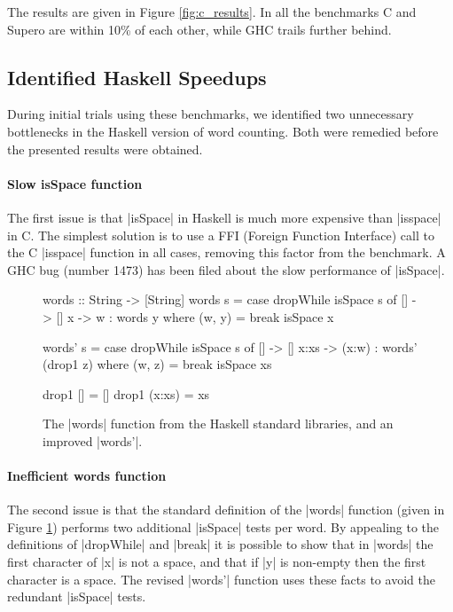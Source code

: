 The results are given in Figure \ref{fig:c_results}. In all the benchmarks C and Supero are within 10\% of each other, while GHC trails further behind.

\subsection{Identified Haskell Speedups}

During initial trials using these benchmarks, we identified two unnecessary bottlenecks in the Haskell version of word counting. Both were remedied before the presented results were obtained.

\paragraph{Slow \textsf{isSpace} function}

The first issue is that |isSpace| in Haskell is much more expensive than |isspace| in C. The simplest solution is to use a FFI (Foreign Function Interface) \cite{spj:awkward_squad} call to the C |isspace| function in all cases, removing this factor from the benchmark. A GHC bug (number 1473) has been filed about the slow performance of |isSpace|.

\begin{figure}
\begin{code}
words :: String -> [String]
words s = case  dropWhile isSpace s of
                []  ->  []
                x   ->  w : words y
                        where (w, y) = break isSpace x

words' s = case  dropWhile isSpace s of
                 []    ->  []
                 x:xs  ->  (x:w) : words' (drop1 z)
                           where (w, z) = break isSpace xs

drop1 []      = []
drop1 (x:xs)  = xs
\end{code}
\caption{The |words| function from the Haskell standard libraries, and an improved |words'|.}
\label{fig:words}
\end{figure}

\paragraph{Inefficient \textsf{words} function}

The second issue is that the standard definition of the |words| function (given in Figure \ref{fig:words}) performs two additional |isSpace| tests per word. By appealing to the definitions of |dropWhile| and |break| it is possible to show that in |words| the first character of |x| is not a space, and that if |y| is non-empty then the first character is a space. The revised |words'| function uses these facts to avoid the redundant |isSpace| tests.

